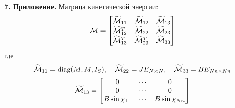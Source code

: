 {\bf 7. Приложение.}
Матрица кинетической энергии:
$$
\mathcal{M} = \begin{bmatrix}
    \widetilde{\mathcal{M}}_{11}   & \widetilde{\mathcal{M}}_{12}   & \widetilde{\mathcal{M}}_{13} \\
    \widetilde{\mathcal{M}}_{12}^T & \widetilde{\mathcal{M}}_{22}   & \widetilde{\mathcal{M}}_{23} \\
    \widetilde{\mathcal{M}}_{13}^T & \widetilde{\mathcal{M}}_{23}^T & \widetilde{\mathcal{M}}_{33} \\
\end{bmatrix}
$$
где
$$
\widetilde{\mathcal{M}}_{11} = \text{diag}(M, M, I_S),
\quad
\widetilde{\mathcal{M}}_{22} = JE_{N \times N},
\quad
\widetilde{\mathcal{M}}_{33} = BE_{Nn \times Nn}
$$
$$
\widetilde{\M}_{13} = \begin{bmatrix}
        0                      & \cdots & 0                      \\
        0                      & \cdots & 0                      \\
        B\sin\chi_{11}         & \cdots & B\sin\chi_{Nn}         \\
    \end{bmatrix}
\vsp
$$

